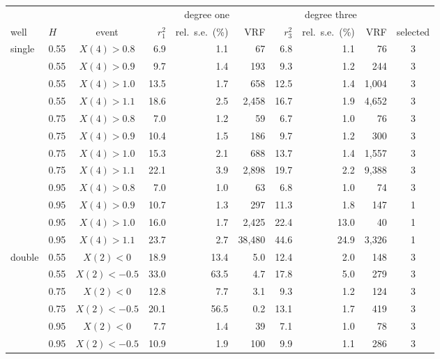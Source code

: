 \begin{tabular}{llcrrrrrrc}\toprule
 & & & \multicolumn{3}{c}{degree one} & \multicolumn{3}{c}{degree three} & \\\cmidrule(lr){4-6}\cmidrule(lr){7-9}
well & $H$ & event & $r_1^2$ & rel.\ s.e.\ (\%) & VRF & $r_3^2$ & rel.\ s.e.\ (\%) & VRF & selected\\\midrule
single & 0.55 & $X(4)>0.8$ & 6.9 & 1.1 & 67 & 6.8 & 1.1 & 76 & 3\\
 & 0.55 & $X(4)>0.9$ & 9.7 & 1.4 & 193 & 9.3 & 1.2 & 244 & 3\\
 & 0.55 & $X(4)>1.0$ & 13.5 & 1.7 & 658 & 12.5 & 1.4 & 1{,}004 & 3\\
 & 0.55 & $X(4)>1.1$ & 18.6 & 2.5 & 2{,}458 & 16.7 & 1.9 & 4{,}652 & 3\\
 & 0.75 & $X(4)>0.8$ & 7.0 & 1.2 & 59 & 6.7 & 1.0 & 76 & 3\\
 & 0.75 & $X(4)>0.9$ & 10.4 & 1.5 & 186 & 9.7 & 1.2 & 300 & 3\\
 & 0.75 & $X(4)>1.0$ & 15.3 & 2.1 & 688 & 13.7 & 1.4 & 1{,}557 & 3\\
 & 0.75 & $X(4)>1.1$ & 22.1 & 3.9 & 2{,}898 & 19.7 & 2.2 & 9{,}388 & 3\\
 & 0.95 & $X(4)>0.8$ & 7.0 & 1.0 & 63 & 6.8 & 1.0 & 74 & 3\\
 & 0.95 & $X(4)>0.9$ & 10.7 & 1.3 & 297 & 11.3 & 1.8 & 147 & 1\\
 & 0.95 & $X(4)>1.0$ & 16.0 & 1.7 & 2{,}425 & 22.4 & 13.0 & 40 & 1\\
 & 0.95 & $X(4)>1.1$ & 23.7 & 2.7 & 38{,}480 & 44.6 & 24.9 & 3{,}326 & 1\\
\midrule
double & 0.55 & $X(2)<0$ & 18.9 & 13.4 & 5.0 & 12.4 & 2.0 & 148 & 3\\
 & 0.55 & $X(2)<-0.5$ & 33.0 & 63.5 & 4.7 & 17.8 & 5.0 & 279 & 3\\
 & 0.75 & $X(2)<0$ & 12.8 & 7.7 & 3.1 & 9.3 & 1.2 & 124 & 3\\
 & 0.75 & $X(2)<-0.5$ & 20.1 & 56.5 & 0.2 & 13.1 & 1.7 & 419 & 3\\
 & 0.95 & $X(2)<0$ & 7.7 & 1.4 & 39 & 7.1 & 1.0 & 78 & 3\\
 & 0.95 & $X(2)<-0.5$ & 10.9 & 1.9 & 100 & 9.9 & 1.1 & 286 & 3\\
\bottomrule\end{tabular}

